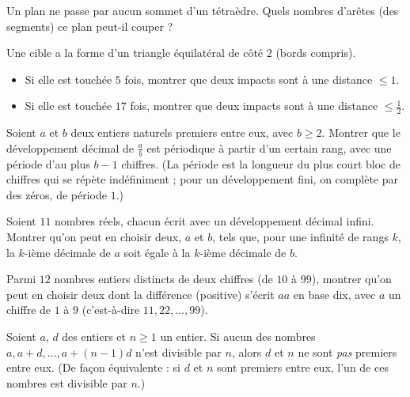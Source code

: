     \begin{exercise}
    Un plan ne passe par aucun sommet d’un tétraèdre. Quels nombres d’arêtes (des segments) ce plan peut-il couper ?
    \end{exercise}

    \begin{exercise}
        Une cible a la forme d'un triangle équilatéral de côté \( 2 \) (bords compris).
        \begin{itemize}
            \item[(a)] Si elle est touchée \( 5 \) fois, montrer que deux impacts sont à une distance \( \leq 1 \).
            \item[(b)] Si elle est touchée \( 17 \) fois, montrer que deux impacts sont à une distance \( \leq \frac{1}{2} \).
        \end{itemize}
    \end{exercise}

    \begin{exercise}
        Soient \( a \) et \( b \) deux entiers naturels premiers entre eux, avec \( b \geq 2 \). Montrer que le développement décimal de \( \frac{a}{b} \) est périodique à partir d'un certain rang, avec une période d'au plus \( b - 1 \) chiffres. (La période est la longueur du plus court bloc de chiffres qui se répète indéfiniment ; pour un développement fini, on complète par des zéros, de période \( 1 \).)
    \end{exercise}

    \begin{exercise}
        Soient \( 11 \) nombres réels, chacun écrit avec un développement décimal infini. Montrer qu'on peut en choisir deux, \( a \) et \( b \), tels que, pour une infinité de rangs \( k \), la \( k \)-ième décimale de \( a \) soit égale à la \( k \)-ième décimale de \( b \).
    \end{exercise}

    \begin{exercise}
        Parmi \( 12 \) nombres entiers distincts de deux chiffres (de \( 10 \) à \( 99 \)), montrer qu'on peut en choisir deux dont la différence (positive) s'écrit \( aa \) en base dix, avec \( a \) un chiffre de \( 1 \) à \( 9 \) (c'est-à-dire \( 11, 22, \ldots, 99 \)).
    \end{exercise}

    \begin{exercise}
        Soient \( a \), \( d \) des entiers et \( n \geq 1 \) un entier. Si aucun des nombres \( a, a + d, \ldots, a + (n-1)d \) n'est divisible par \( n \), alors \( d \) et \( n \) ne sont \emph{pas} premiers entre eux. (De façon équivalente : si \( d \) et \( n \) sont premiers entre eux, l'un de ces nombres est divisible par \( n \).)
    \end{exercise}

